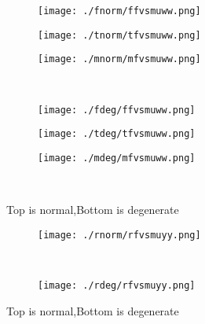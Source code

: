 \documentclass[aps,floats,floatfix,nofootinbib]{revtex4-1}
\begin{document}
\begin{center}
\begin{figure}
\begin{subfigure}{0.3\textwidth}
\texttt{[image: ./fnorm/ffvsmuww.png]}
\label{}
\end{subfigure}
\begin{subfigure}{0.3\textwidth}
\texttt{[image: ./tnorm/tfvsmuww.png]}
\label{}
\end{subfigure}
\begin{subfigure}{0.3\textwidth}
\texttt{[image: ./mnorm/mfvsmuww.png]}
\label{}
\end{subfigure}\\
\begin{subfigure}{0.3\textwidth}
\texttt{[image: ./fdeg/ffvsmuww.png]}
\label{}
\end{subfigure}
\begin{subfigure}{0.3\textwidth}
\texttt{[image: ./tdeg/tfvsmuww.png]}
\label{}
\end{subfigure}
\begin{subfigure}{0.3\textwidth}
\texttt{[image: ./mdeg/mfvsmuww.png]}
\label{}
\end{subfigure}\\
\caption{Top is normal,Bottom is degenerate}
\end{figure}
\end{center}

\begin{center}
\begin{figure}
\begin{subfigure}{1.0\textwidth}
\texttt{[image: ./rnorm/rfvsmuyy.png]}
\label{}
\end{subfigure}\\
\begin{subfigure}{1.0\textwidth}
\texttt{[image: ./rdeg/rfvsmuyy.png]}
\label{}
\end{subfigure}
\caption{Top is normal,Bottom is degenerate}
\end{figure}
\end{center}
\end{document}
